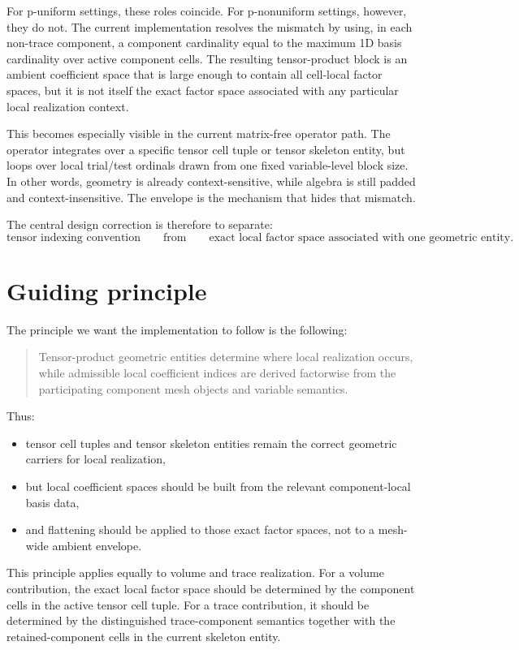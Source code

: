 \documentclass[11pt]{article}
\begin{document}
For p-uniform settings, these roles coincide.  For p-nonuniform settings, however, they do not.  The current implementation resolves the mismatch by using, in each non-trace component, a component cardinality equal to the maximum 1D basis cardinality over active component cells.  The resulting tensor-product block is an ambient coefficient space that is large enough to contain all cell-local factor spaces, but it is not itself the exact factor space associated with any particular local realization context.

This becomes especially visible in the current matrix-free operator path.  The operator integrates over a specific tensor cell tuple or tensor skeleton entity, but loops over local trial/test ordinals drawn from one fixed variable-level block size.  In other words, geometry is already context-sensitive, while algebra is still padded and context-insensitive.  The envelope is the mechanism that hides that mismatch.

The central design correction is therefore to separate:
\[
\text{tensor indexing convention}
\qquad \text{from} \qquad
\text{exact local factor space associated with one geometric entity}.
\]

\section{Guiding principle}

The principle we want the implementation to follow is the following:

\begin{quote}
Tensor-product geometric entities determine where local realization occurs, while admissible local coefficient indices are derived factorwise from the participating component mesh objects and variable semantics.
\end{quote}

Thus:

\begin{itemize}[leftmargin=2em]
\item tensor cell tuples and tensor skeleton entities remain the correct geometric carriers for local realization,
\item but local coefficient spaces should be built from the relevant component-local basis data,
\item and flattening should be applied to those exact factor spaces, not to a mesh-wide ambient envelope.
\end{itemize}

This principle applies equally to volume and trace realization.  For a volume contribution, the exact local factor space should be determined by the component cells in the active tensor cell tuple.  For a trace contribution, it should be determined by the distinguished trace-component semantics together with the retained-component cells in the current skeleton entity.
\end{document}
